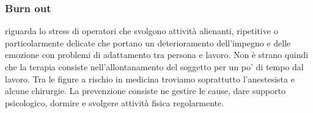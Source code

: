 \subsubsection{Burn out}

riguarda lo stress di operatori che svolgono attività alienanti,
ripetitive o particolarmente delicate che portano un deterioramento
dell'impegno e delle emozione con problemi di adattamento tra persona e
lavoro. Non è strano quindi che la terapia consiste nell'allontanamento
del soggetto per un po' di tempo dal lavoro. Tra le figure a rischio in
medicina troviamo soprattutto l'anestesista e alcune chirurgie. La
prevenzione consiste ne gestire le cause, dare supporto psicologico,
dormire e svolgere attività fisica regolarmente.